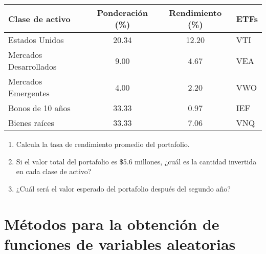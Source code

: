 \documentclass[11pt,a4paper]{report}
\begin{document}
\begin{enumerate}
\begin{table}[h]
    \centering
    \begin{tabular}{|l c c l|}
        \hline
         Clase de activo& Ponderación (\%) & Rendimiento (\%) & ETFs \\
         \hline
         Estados Unidos& 20.34 & 12.20 & VTI \\
         Mercados Desarrollados & 9.00 & 4.67 & VEA \\
         Mercados Emergentes & 4.00 & 2.20 & VWO \\
         Bonos de 10 años & 33.33 & 0.97 & IEF \\
         Bienes raíces & 33.33 & 7.06 & VNQ \\
         \hline
    \end{tabular}
\end{table}

\begin{enumerate} 

    \item Calcula la tasa de rendimiento promedio del portafolio. 

    \item Si el valor total del portafolio es \$5.6 millones, ¿cuál es la cantidad invertida en cada clase de activo?
    
    \item ¿Cuál será el valor esperado del portafolio después del segundo año? \end{enumerate}


\end{enumerate}

\chapter{Métodos para la obtención de funciones de variables aleatorias}
\end{document}
